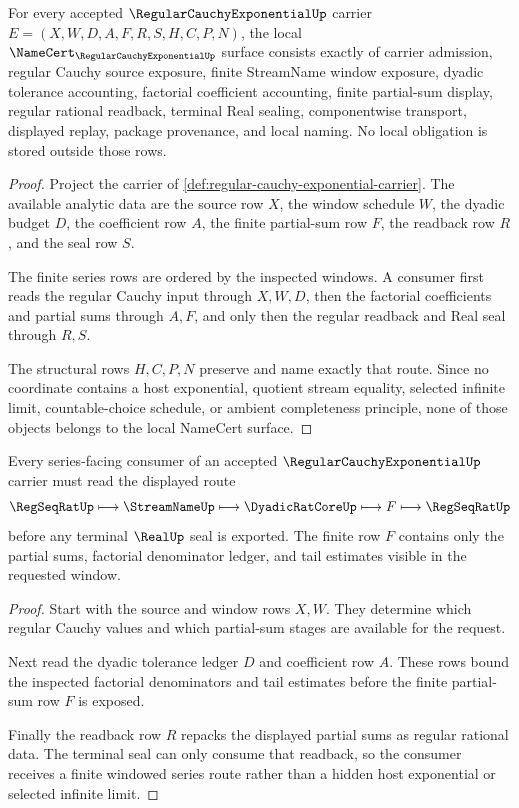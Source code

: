 \begin{theorem}
\label{thm:regular-cauchy-exponential-namecert-obligations}
For every accepted $\RegularCauchyExponentialUp$ carrier $E=(X,W,D,A,F,R,S,H,C,P,N)$, the local $\NameCert_{\RegularCauchyExponentialUp}$ surface consists exactly of carrier admission, regular Cauchy source exposure, finite StreamName window exposure, dyadic tolerance accounting, factorial coefficient accounting, finite partial-sum display, regular rational readback, terminal Real sealing, componentwise transport, displayed replay, package provenance, and local naming. No local obligation is stored outside those rows.
\end{theorem}
\begin{proof}
Project the carrier of \autoref{def:regular-cauchy-exponential-carrier}. The available analytic data are the source row $X$, the window schedule $W$, the dyadic budget $D$, the coefficient row $A$, the finite partial-sum row $F$, the readback row $R$, and the seal row $S$.

The finite series rows are ordered by the inspected windows. A consumer first reads the regular Cauchy input through $X,W,D$, then the factorial coefficients and partial sums through $A,F$, and only then the regular readback and Real seal through $R,S$.

The structural rows $H,C,P,N$ preserve and name exactly that route. Since no coordinate contains a host exponential, quotient stream equality, selected infinite limit, countable-choice schedule, or ambient completeness principle, none of those objects belongs to the local NameCert surface.
\end{proof}

\begin{theorem}
\label{thm:regular-cauchy-exponential-series-window}
Every series-facing consumer of an accepted $\RegularCauchyExponentialUp$ carrier must read the displayed route
$$
\RegSeqRatUp \longmapsto \StreamNameUp \longmapsto \DyadicRatCoreUp \longmapsto F \longmapsto \RegSeqRatUp
$$
before any terminal $\RealUp$ seal is exported. The finite row $F$ contains only the partial sums, factorial denominator ledger, and tail estimates visible in the requested window.
\end{theorem}
\begin{proof}
Start with the source and window rows $X,W$. They determine which regular Cauchy values and which partial-sum stages are available for the request.

Next read the dyadic tolerance ledger $D$ and coefficient row $A$. These rows bound the inspected factorial denominators and tail estimates before the finite partial-sum row $F$ is exposed.

Finally the readback row $R$ repacks the displayed partial sums as regular rational data. The terminal seal can only consume that readback, so the consumer receives a finite windowed series route rather than a hidden host exponential or selected infinite limit.
\end{proof}

